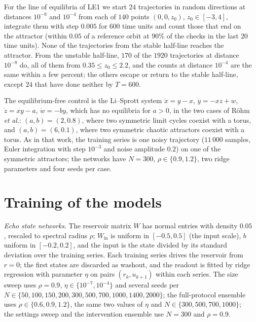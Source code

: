 For the line of equilibria of LE1 we start $24$ trajectories in random directions at distances $10^{-8}$ and $10^{-4}$ from
each of $140$ points $(0,0,z_0)$, $z_0\in[-3,4]$, integrate them with step $0.005$ for $600$ time units and count those that
end on the attractor (within $0.05$ of a reference orbit at $90\%$ of the checks in the last $20$ time units). None of
the trajectories from the stable half-line reaches the attractor. From the unstable half-line, $170$ of the $1920$ trajectories at distance $10^{-8}$
do, all of them from $0.35\le z_0\le2.2$, and the counts at distance $10^{-4}$ are the same within a few percent; the others
escape or return to the stable half-line, except $24$ that have done neither by $T=600$.

The equilibrium-free control is the Li--Sprott system\cite{LiSprott2014} $\dot x=y-x$, $\dot y=-xz+w$, $\dot z=xy-a$,
$\dot w=-by$, which has no equilibria for $a>0$, in the two cases of R\"ohm \textit{et al.}:\cite{Rohm2021} $(a,b)=(2,0.8)$,
where two symmetric limit cycles coexist with a torus, and $(a,b)=(6,0.1)$, where two symmetric chaotic attractors coexist
with a torus. As in that work, the training series is one noisy trajectory ($11\,000$ samples, Euler integration with step
$10^{-3}$ and noise amplitude $0.2$) on one of the symmetric attractors; the networks have $N=300$, $\rho\in\{0.9,1.2\}$, two
ridge parameters and four seeds per case.

\section{Training of the models}
\label{app:training}

\emph{Echo state networks.} The reservoir matrix $W$ has normal entries with density $0.05$, rescaled to spectral radius
$\rho$; $W_{\mathrm{in}}$ is uniform in $[-0.5,0.5]$ (the input scale), $b$ uniform in $[-0.2,0.2]$, and the input is the
state divided by its standard deviation over the training series. Each training series drives the reservoir from $r=0$;
the first states are discarded as washout, and the readout is fitted by ridge regression with parameter $\eta$ on pairs
$(r_k,u_{k+1})$ within each series. The size sweep uses $\rho=0.9$, $\eta\in\{10^{-7},10^{-4}\}$ and several seeds per
$N\in\{50,100,150,200,300,500,700,1000,1400,2000\}$; the full-protocol ensemble uses $\rho\in\{0.6,0.9,1.2\}$, the same two
values of $\eta$ and $N\in\{300,500,700,1000\}$; the settings sweep and the intervention ensemble use $N=300$ and
$\rho=0.9$.


